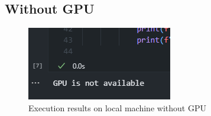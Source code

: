 \documentclass[12pt]{article}
\begin{document}
\subsection{Without GPU}
\begin{figure}[H]
    \centering
    \includegraphics[width=0.75\linewidth]{images/output2.png}
    \caption{Execution results on local machine without GPU}
    \label{fig:nogpu}
\end{figure}
\end{document}
